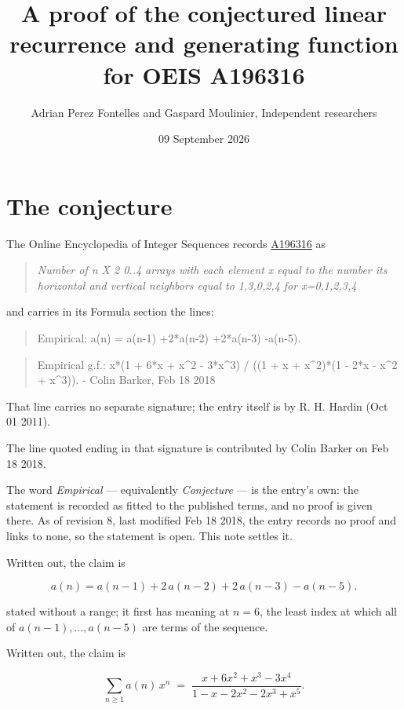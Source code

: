 \documentclass[11pt]{article}
\title{A proof of the conjectured linear recurrence and generating function for OEIS A196316}
\author{Adrian Perez Fontelles and Gaspard Moulinier, Independent researchers}
\date{09 September 2026}
\theoremstyle{definition}
\begin{document}
\maketitle
\section{The conjecture}

The Online Encyclopedia of Integer Sequences records \href{https://oeis.org/A196316}{A196316} as

\begin{quote}\itshape Number of n X 2 0..4 arrays with each element x equal to the number its horizontal and vertical neighbors equal to 1,3,0,2,4 for x=0,1,2,3,4\end{quote}

and carries in its Formula section the lines:

\begin{quote}\ttfamily Empirical: a(n) = a(n-1) +2*a(n-2) +2*a(n-3) -a(n-5).\end{quote}

\begin{quote}\ttfamily Empirical g.f.: x*(1 + 6*x + x\textasciicircum{}2 - 3*x\textasciicircum{}3) / ((1 + x + x\textasciicircum{}2)*(1 - 2*x - x\textasciicircum{}2 + x\textasciicircum{}3)). - Colin Barker, Feb 18 2018\end{quote}

That line carries no separate signature; the entry itself is by R. H. Hardin (Oct 01 2011).

The line quoted ending in that signature is contributed by Colin Barker on Feb 18 2018.

The word {\itshape Empirical} --- equivalently {\itshape Conjecture} --- is the entry's own: the statement is recorded as fitted to the published terms, and no proof is given there. As of revision 8, last modified Feb 18 2018, the entry records no proof and links to none, so the statement is open. This note settles it.

Written out, the claim is

\[a(n) = a(n-1) + 2\,a(n-2) + 2\,a(n-3) - a(n-5).\]

stated without a range; it first has meaning at $n = 6$, the least index at which all of $a(n-1),\dots,a(n-5)$ are terms of the sequence.

Written out, the claim is

\[\sum_{n \ge 1} a(n)\,x^n \;=\; \frac{x + 6x^{2} + x^{3} - 3x^{4}}{1 - x - 2x^{2} - 2x^{3} + x^{5}}.\]
\end{document}
